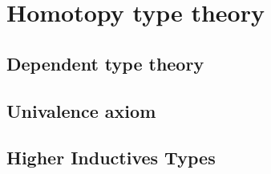\chapter{Homotopy type theory}
\label{chap:hott}

\section{Dependent type theory}
\label{sec:mltt}

\section{Univalence axiom}
\label{sec:ua}

\section{Higher Inductives Types}
\label{sec:hit}
